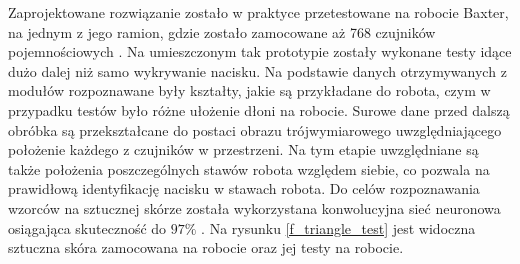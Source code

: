 Zaprojektowane rozwiązanie zostało w praktyce przetestowane na robocie Baxter, na jednym z jego ramion, gdzie zostało zamocowane aż 768 czujników pojemnościowych \cite{b_site_baxter}. Na umieszczonym tak prototypie zostały wykonane testy idące dużo dalej niż samo wykrywanie nacisku. Na podstawie danych otrzymywanych z modułów rozpoznawane były kształty, jakie są przykładane do robota, czym w przypadku testów było różne ułożenie dłoni na robocie. Surowe dane przed dalszą obróbka są przekształcane do postaci obrazu trójwymiarowego uwzględniającego położenie każdego z czujników w przestrzeni.
Na tym etapie uwzględniane są także położenia poszczególnych stawów robota względem siebie, co pozwala na prawidłową identyfikację nacisku w stawach robota.
Do celów rozpoznawania wzorców na sztucznej skórze została wykorzystana konwolucyjna sieć neuronowa osiągająca skuteczność do $97\%$
\cite{b_konf_wloch_2_reka, b_konf_wloch_3_reka}. Na rysunku \ref{f_triangle_test} jest widoczna sztuczna skóra zamocowana na robocie oraz jej testy na robocie.

